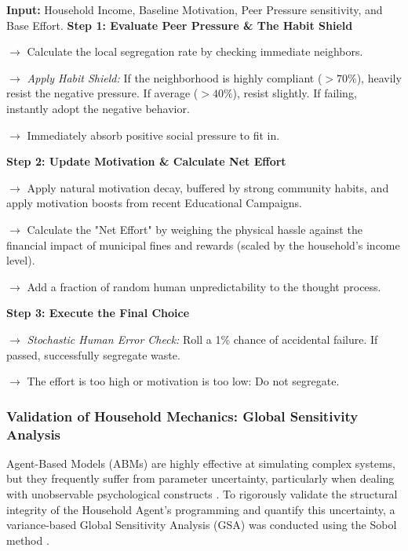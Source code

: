 \begin{algorithm}[H]
\caption{The Household's Daily Decision Process (To Segregate or Not?)}
\label{alg:household_decision_english}
\begin{algorithmic}[1]
\State \textbf{Input:} Household Income, Baseline Motivation, Peer Pressure sensitivity, and Base Effort.
\Statex
\State \textbf{Step 1: Evaluate Peer Pressure \& The Habit Shield}
\State \parbox[t]{0.9\linewidth}{$\rightarrow$ Calculate the local segregation rate by checking immediate neighbors.\strut}
    \State \parbox[t]{0.88\linewidth}{$\rightarrow$ \textit{Apply Habit Shield:} If the neighborhood is highly compliant ($>70\%$), heavily resist the negative pressure. If average ($>40\%$), resist slightly. If failing, instantly adopt the negative behavior.\strut}
\Else
    \State \parbox[t]{0.88\linewidth}{$\rightarrow$ Immediately absorb positive social pressure to fit in.\strut}
\EndIf
\Statex
\State \textbf{Step 2: Update Motivation \& Calculate Net Effort}
\State \parbox[t]{0.9\linewidth}{$\rightarrow$ Apply natural motivation decay, buffered by strong community habits, and apply motivation boosts from recent Educational Campaigns.\strut}
\State \parbox[t]{0.9\linewidth}{$\rightarrow$ Calculate the "Net Effort" by weighing the physical hassle against the financial impact of municipal fines and rewards (scaled by the household's income level).\strut}
\State \parbox[t]{0.9\linewidth}{$\rightarrow$ Add a fraction of random human unpredictability to the thought process.\strut}
\Statex
\State \textbf{Step 3: Execute the Final Choice}
    \State \parbox[t]{0.88\linewidth}{$\rightarrow$ \textit{Stochastic Human Error Check:} Roll a 1\% chance of accidental failure. If passed, successfully segregate waste.\strut}
\Else
    \State \parbox[t]{0.88\linewidth}{$\rightarrow$ The effort is too high or motivation is too low: Do not segregate.\strut}
\EndIf
\end{algorithmic}
\end{algorithm}


\subsubsection{Validation of Household Mechanics: Global Sensitivity Analysis}

Agent-Based Models (ABMs) are highly effective at simulating complex systems, but they frequently suffer from parameter uncertainty, particularly when dealing with unobservable psychological constructs \citep{McCulloch2022}. To rigorously validate the structural integrity of the Household Agent's programming and quantify this uncertainty, a variance-based Global Sensitivity Analysis (GSA) was conducted using the Sobol method \citep{Sobol2001}. 


